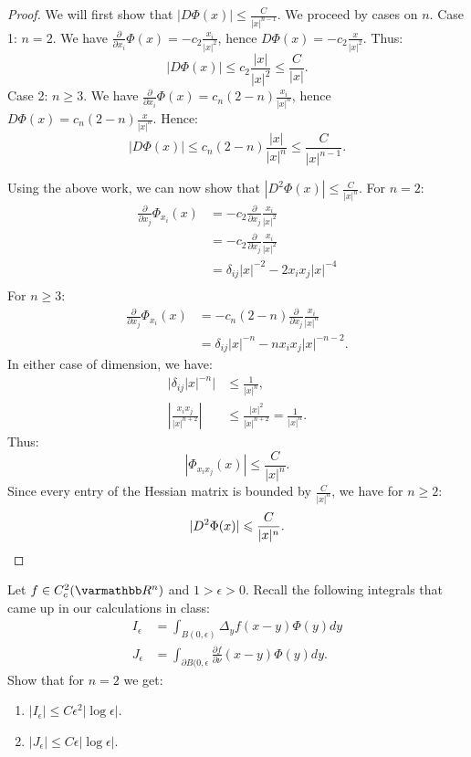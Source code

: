 \documentclass[10pt,oneside,openany]{memoir}
\begin{document}
	\begin{proof}
		We will first show that $|D \Phi(x)| \leq \frac{C}{|x|^{n-1}}$. We proceed by cases on $n$. Case 1: $n = 2$. We have $\frac{\partial}{\partial x_i}\Phi(x) = -c_2 \frac{x_i}{|x|^2}$, hence $D \Phi(x) = -c_2 \frac{x}{|x|^2}$. Thus:
		\[
			|D \Phi(x)| \leq c_2 \frac{|x|}{|x|^2} \leq \frac{C}{|x|}.
		\] 
		Case 2: $n \geq 3$. We have $\frac{\partial}{\partial x_i}\Phi(x) = c_n(2-n) \frac{x_i}{|x|^n}$, hence $D \Phi(x) = c_n (2-n) \frac{x}{|x|^n}$. Hence:
		\[
			|D \Phi(x)| \leq c_n(2-n) \frac{|x|}{|x|^n} \leq \frac{C}{|x|^{n-1}}.
		\]

		Using the above work, we can now show that $|D^2 \Phi(x)| \leq \frac{C}{|x|^n}$. For $n=2$:
		\begin{align*}
			\frac{\partial}{\partial x_j}\Phi_{x_i}(x)
			& = -c_2 \frac{\partial}{\partial x_j} \frac{x_i}{|x|^2} \\
			& = -c_2 \frac{\partial}{\partial x_j} \frac{x_i}{|x|^2} \\
			&= \delta_{ij} |x|^{-2} - 2 x_i x_j |x|^{-4}  \\
		\end{align*}
		For $n \geq 3$:
		\begin{align*}
			\frac{\partial}{\partial x_j}\Phi_{x_i}(x)
			& = -c_n(2-n) \frac{\partial}{\partial x_j} \frac{x_i}{|x|^n} \\
			& = \delta_{ij}|x|^{-n} - nx_i x_j |x|^{-n-2}.
		\end{align*}
		In either case of dimension, we have:
		\begin{align*}
			\bigl|\delta_{ij} |x|^{-n}\bigr| &\leq \frac{1}{|x|^n}, \\
			\left| \frac{x_i x_j}{|x|^{n+2}} \right| &\leq \frac{|x|^2}{|x|^{n+2}} = \frac{1}{|x|^n}.
		\end{align*}
		Thus:
		\[
			|\Phi_{x_i x_j}(x)| \leq \frac{C}{|x|^n}.
		\]
		Since every entry of the Hessian matrix is bounded by $\frac{C}{|x|^n}$, we have for $n \geq 2$:
		\[
			|D^2 \Phi(x)| \leq \frac{C}{|x|^n}. \qedhere
		\] 
	\end{proof}
\begin{exercise}
	Let $f \in C^2_c(\bfR^n)$ and $1 > \epsilon > 0$. Recall the following integrals that came up in our calculations in class:
	\begin{align*}
		I_\epsilon &= \int_{B(0,\epsilon)}^{} \Delta_y f(x-y)\Phi(y)dy\\
		J_\epsilon &= \int_{\partial B(0,\epsilon}^{} \frac{\partial f}{\partial \nu}(x-y) \Phi(y)dy.
	\end{align*}
	Show that for $n = 2$ we get:
	\begin{enumerate}[label = (\alph*),itemsep=1pt,topsep=3pt]
		\item $ |I_\epsilon| \leq C \epsilon^2 |\log \epsilon|$.
		\item $|J_\epsilon| \leq C \epsilon |\log \epsilon|$.
	\end{enumerate}
\end{exercise}
\end{document}
